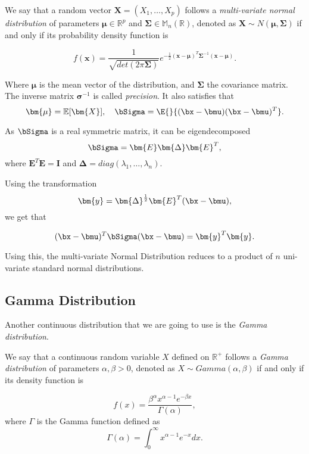\begin{definition}
We say that a random vector \(\bm{X} = (X_1,\dots,X_p)\) follows a \emph{multi-variate normal
  distribution} of parameters \(\bm{\mu} \in \mathbb{R}^p\) and \(\bm{\Sigma}
\in \mathbb{M}_n(\mathbb{R})\), denoted as \(\bm{X} \sim N(\bm{\mu},
\bm{\Sigma})\) if and only if its probability density function is

\[
  f(\bm{x}) = \frac{1}{\sqrt{det(2\pi \bm{\Sigma})}}e^{-\frac{1}{2}(\bm{x} - \bm{\mu})^T\bm{\Sigma}^{-1}(\bm{x}-\bm{\mu})} .
\]

Where \(\bm{\mu}\) is the mean vector of the distribution, and \(\bm{\Sigma}\)
the covariance matrix. The inverse matrix \(\bm{\sigma}^{-1}\) is called \emph{precision}.
It also satisfies that
\[
\bm{\mu} = \mathbb{E}[\bm{X}], \quad \bSigma = \E{}{(\bx - \bmu)(\bx - \bmu)^T}.
\]

As \(\bSigma\) is a real symmetric matrix, it can be eigendecomposed
\[
  \bSigma = \bm{E}\bm{\Delta}\bm{E}^T,
\]
where \(\bm{E}^T\bm{E} = \bm{I}\) and \(\bm{\Delta} =
diag(\lambda_1,\dots,\lambda_n)\).

Using the transformation
\[
  \bm{y} = \bm{\Delta}^{\frac{1}{2}}\bm{E}^T(\bx - \bmu),
\]
we get that

\[
  (\bx - \bmu)^T\bSigma(\bx - \bmu) = \bm{y}^T\bm{y}.
\]

Using this, the multi-variate Normal Distribution reduces to a product of \(n\)
uni-variate standard normal distributions.

\end{definition}

\subsection*{Gamma Distribution}

Another continuous distribution that we are going to use is the \emph{Gamma
  distribution}.

\begin{definition}

  We say that a continuous random variable \(X\) defined on \(\mathbb{R}^{+}\)  follows a \emph{Gamma distribution} of parameters \(\alpha,
\beta > 0\), denoted as \(X \sim Gamma(\alpha, \beta)\) if and only if its
density function is

\[
  f(x) = \frac{\beta^{\alpha} x^{\alpha-1}e^{-\beta x}}{\Gamma(\alpha)},
\]
where \(\Gamma\) is the Gamma function defined as
\[
  \Gamma(\alpha) = \int_{0}^{\infty}x^{\alpha-1}e^{-x} dx.
\]
\end{definition}

